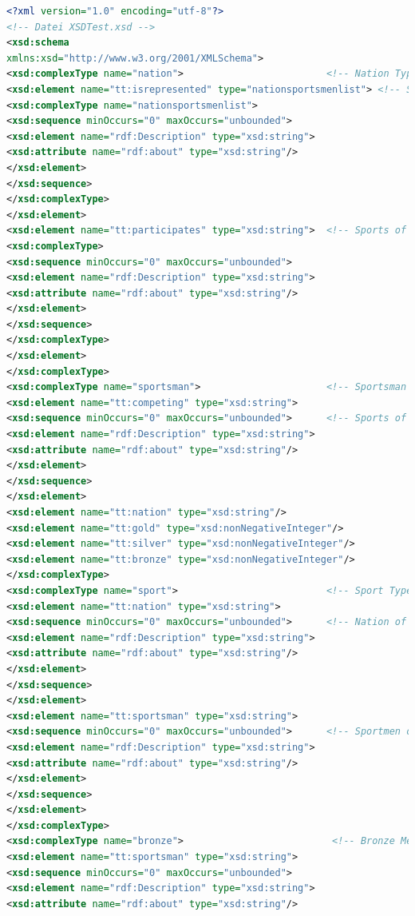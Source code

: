 \documentclass[pagesize=auto, titlepage=on]{scrartcl}
\begin{document}
\begin{lstlisting}[language=XML]
<?xml version="1.0" encoding="utf-8"?>
<!-- Datei XSDTest.xsd -->
<xsd:schema
xmlns:xsd="http://www.w3.org/2001/XMLSchema">
<xsd:complexType name="nation">                         <!-- Nation Type Definition -->
<xsd:element name="tt:isrepresented" type="nationsportsmenlist"> <!-- Sportsmen of Nation -->
<xsd:complexType name="nationsportsmenlist">
<xsd:sequence minOccurs="0" maxOccurs="unbounded">
<xsd:element name="rdf:Description" type="xsd:string">
<xsd:attribute name="rdf:about" type="xsd:string"/>
</xsd:element>
</xsd:sequence>
</xsd:complexType>
</xsd:element>
<xsd:element name="tt:participates" type="xsd:string">  <!-- Sports of Nation -->
<xsd:complexType>
<xsd:sequence minOccurs="0" maxOccurs="unbounded">
<xsd:element name="rdf:Description" type="xsd:string">
<xsd:attribute name="rdf:about" type="xsd:string"/>
</xsd:element>
</xsd:sequence>
</xsd:complexType>
</xsd:element>
</xsd:complexType>
<xsd:complexType name="sportsman">                      <!-- Sportsman Type Definition -->
<xsd:element name="tt:competing" type="xsd:string">
<xsd:sequence minOccurs="0" maxOccurs="unbounded">      <!-- Sports of Sportsmen -->
<xsd:element name="rdf:Description" type="xsd:string">
<xsd:attribute name="rdf:about" type="xsd:string"/>
</xsd:element>
</xsd:sequence>
</xsd:element>
<xsd:element name="tt:nation" type="xsd:string"/>
<xsd:element name="tt:gold" type="xsd:nonNegativeInteger"/> 
<xsd:element name="tt:silver" type="xsd:nonNegativeInteger"/>
<xsd:element name="tt:bronze" type="xsd:nonNegativeInteger"/>
</xsd:complexType>
<xsd:complexType name="sport">                          <!-- Sport Type Definition -->
<xsd:element name="tt:nation" type="xsd:string">
<xsd:sequence minOccurs="0" maxOccurs="unbounded">      <!-- Nation of Sport -->
<xsd:element name="rdf:Description" type="xsd:string">
<xsd:attribute name="rdf:about" type="xsd:string"/>
</xsd:element>
</xsd:sequence>
</xsd:element>
<xsd:element name="tt:sportsman" type="xsd:string">
<xsd:sequence minOccurs="0" maxOccurs="unbounded">      <!-- Sportmen of Sport -->
<xsd:element name="rdf:Description" type="xsd:string">
<xsd:attribute name="rdf:about" type="xsd:string"/>
</xsd:element>
</xsd:sequence>
</xsd:element>
</xsd:complexType>
<xsd:complexType name="bronze">                          <!-- Bronze Medals Definition -->
<xsd:element name="tt:sportsman" type="xsd:string">
<xsd:sequence minOccurs="0" maxOccurs="unbounded">
<xsd:element name="rdf:Description" type="xsd:string">
<xsd:attribute name="rdf:about" type="xsd:string"/>

\end{lstlisting}
\end{document}
